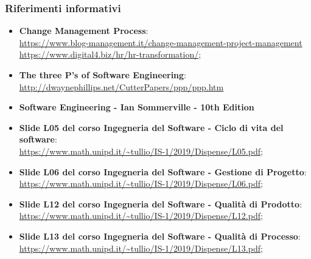 \subsubsection{Riferimenti informativi}
\begin{itemize}
	\item \textbf{Change Management Process}: \\
	\href{https://www.blog-management.it/2018/04/10/change-management-project-management/}{https://www.blog-management.it/change-management-project-management}\\
	\href{https://www.digital4.biz/hr/hr-transformation/digital-transformation-e-change-management-vanno-avanti-di-pari-passo/}{https://www.digital4.biz/hr/hr-transformation/};
	\item \textbf{The three P's of Software Engineering}: \\
	\url{http://dwaynephillips.net/CutterPapers/ppp/ppp.htm}
	\item \textbf{Software Engineering - Ian Sommerville - 10th Edition}
	\item \textbf{Slide L05 del corso Ingegneria del Software - Ciclo di vita del software}: \\
	\url{https://www.math.unipd.it/~tullio/IS-1/2019/Dispense/L05.pdf};
	\item \textbf{Slide L06 del corso Ingegneria del Software - Gestione di Progetto}: \\
	\url{https://www.math.unipd.it/~tullio/IS-1/2019/Dispense/L06.pdf};	
	\item \textbf{Slide L12 del corso Ingegneria del Software - Qualità di Prodotto}: \\
	\url{https://www.math.unipd.it/~tullio/IS-1/2019/Dispense/L12.pdf};
	\item \textbf{Slide L13 del corso Ingegneria del Software - Qualità di Processo}: \\
	\url{https://www.math.unipd.it/~tullio/IS-1/2019/Dispense/L13.pdf};
\end{itemize}
